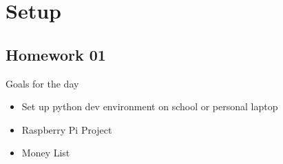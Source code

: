 \documentclass[letterpaper,10pt,english]{jupyterBook}
\begin{document}
\sphinxstepscope


\part{Setup}

\sphinxstepscope


\chapter{Homework 01}
\label{\detokenize{lessons/hw01:homework-01}}\label{\detokenize{lessons/hw01::doc}}
\sphinxAtStartPar
Goals for the day
\begin{itemize}
\item {} 
\sphinxAtStartPar
Set up python dev environment on school or personal laptop

\item {} 
\sphinxAtStartPar
Raspberry Pi Project

\item {} 
\sphinxAtStartPar
Money List

\end{itemize}
\end{document}
